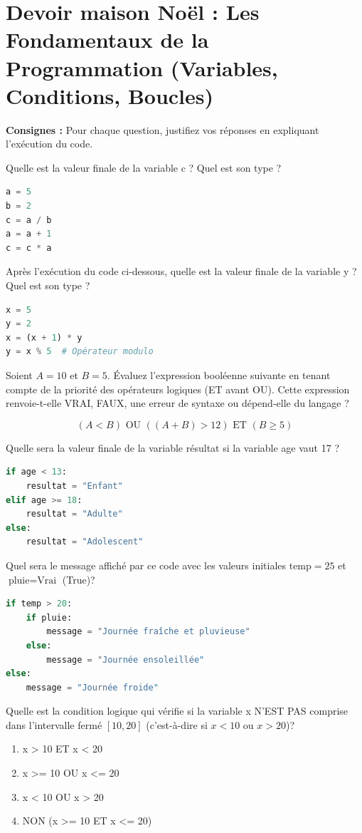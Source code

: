 \setcounter{chapter}{1}
\section*{Devoir maison Noël :  Les Fondamentaux de la Programmation (Variables, Conditions, Boucles)}
\textbf{Consignes : }Pour chaque question,  justifiez vos réponses en expliquant l'exécution du code.


\begin{Exercise}[title={Variables et Opérations}]

\Question Quelle est la valeur finale de la variable c ? Quel est son type ?
\begin{lstlisting}[style=pythonstyle, language=python]
a = 5
b = 2
c = a / b
a = a + 1
c = c * a
\end{lstlisting}


\Question Après l'exécution du code ci-dessous, quelle est la valeur finale de la variable y ? Quel est son type ?
\begin{lstlisting}[style=pythonstyle, language=python]
x = 5
y = 2
x = (x + 1) * y
y = x % 5  # Opérateur modulo
\end{lstlisting}
\end{Exercise}

\begin{Exercise}[title={Conditions (If / Else)}]
\Question Soient $A=10$ et $B=5$. Évaluez l'expression booléenne suivante en tenant compte de la priorité des opérateurs logiques (ET avant OU). Cette expression renvoie-t-elle VRAI, FAUX, une erreur de syntaxe ou dépend-elle du langage ?

$$(A < B) \text{ OU } ((A + B) > 12) \text{ ET } (B \ge 5)$$

\Question Quelle sera la valeur finale de la variable résultat si la variable age vaut 17 ?
\begin{lstlisting}[style=pythonstyle, language=python]
if age < 13:
    resultat = "Enfant"
elif age >= 18:
    resultat = "Adulte"
else:
    resultat = "Adolescent"
\end{lstlisting}


\Question Quel sera le message affiché par ce code avec les valeurs initiales $\text{temp} = 25$ et $\text{pluie} = \text{Vrai}$ (True)?
\begin{lstlisting}[style=pythonstyle, language=python]
if temp > 20:
    if pluie:
        message = "Journée fraîche et pluvieuse"
    else:
        message = "Journée ensoleillée"
else:
    message = "Journée froide"
\end{lstlisting}

\Question Quelle est la condition logique qui vérifie si la variable x N'EST PAS comprise dans l'intervalle fermé $[10, 20]$ (c'est-à-dire si $x < 10$ ou $x > 20$)?
\begin{enumerate}
    \item x > 10 ET x < 20
    \item x >= 10 OU x <= 20
    \item x < 10 OU x > 20
    \item NON (x >= 10 ET x <= 20)
\end{enumerate}
\end{Exercise}


